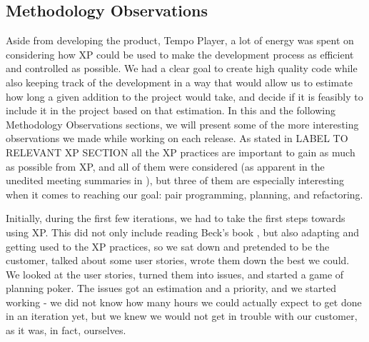 \subsection{Methodology Observations}\label{sec:release1Methodology}
Aside from developing the product, Tempo Player, a lot of energy was spent on considering how XP could be used to make the development process as efficient and controlled as possible. We had a clear goal to create high quality code while also keeping track of the development in a way that would allow us to estimate how long a given addition to the project would take, and decide if it is feasibly to include it in the project based on that estimation.
In this and the following Methodology Observations sections, we will present some of the more interesting observations we made while working on each release. As stated in LABEL TO RELEVANT XP SECTION all the XP practices are important to gain as much as possible from XP, and all of them were considered (as apparent in the unedited meeting summaries in ), but three of them are especially interesting when it comes to reaching our goal: pair programming, planning, and refactoring.\\ 


Initially, during the first few iterations, we had to take the first steps towards using XP. This did not only include reading Beck's book , but also adapting and getting used to the XP practices, so we sat down and pretended to be the customer, talked about some user stories, wrote them down the best we could. We looked at the user stories, turned them into issues, and started a game of planning poker. The issues got an estimation and a priority, and we started working - we did not know how many hours we could actually expect to get done in an iteration yet, but we knew we would not get in trouble with our customer, as it was, in fact, ourselves.





